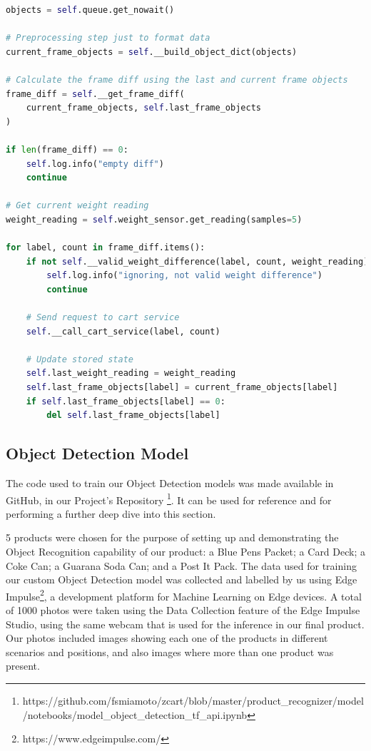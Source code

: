 \documentclass[openright]{normas-utf-tex} %
\begin{document}
\begin{lstlisting}[language=Python,caption={Product Recognizer thread logic}]
objects = self.queue.get_nowait()

# Preprocessing step just to format data
current_frame_objects = self.__build_object_dict(objects)

# Calculate the frame diff using the last and current frame objects
frame_diff = self.__get_frame_diff(
    current_frame_objects, self.last_frame_objects
)

if len(frame_diff) == 0:
    self.log.info("empty diff")
    continue

# Get current weight reading
weight_reading = self.weight_sensor.get_reading(samples=5)

for label, count in frame_diff.items():
    if not self.__valid_weight_difference(label, count, weight_reading):
        self.log.info("ignoring, not valid weight difference")
        continue

    # Send request to cart service
    self.__call_cart_service(label, count)

    # Update stored state
    self.last_weight_reading = weight_reading
    self.last_frame_objects[label] = current_frame_objects[label]
    if self.last_frame_objects[label] == 0:
        del self.last_frame_objects[label]
\end{lstlisting}

\subsection{Object Detection Model}

The code used to train our Object Detection models was made available in GitHub,
in our Project's Repository
\footnote{https://github.com/fsmiamoto/zcart/blob/master/product\_recognizer/model/notebooks/model\_object\_detection\_tf\_api.ipynb}.
It can be used for reference and for performing a further deep dive into this section.

5 products were chosen for the purpose of setting up and demonstrating the Object Recognition 
capability of our product: a Blue Pens Packet; a Card Deck; a Coke Can; a Guarana Soda Can; 
and a Post It Pack. 
The data used for training our custom Object Detection model was collected and labelled by us
using Edge Impulse\footnote{https://www.edgeimpulse.com/}, a development platform for Machine 
Learning on Edge devices.
A total of 1000 photos were taken using the Data Collection feature of the Edge Impulse Studio,
using the same webcam that is used for the inference in our final product.
Our photos included images showing each one of the products in different scenarios and positions, 
and also images where more than one product was present.
\end{document}
